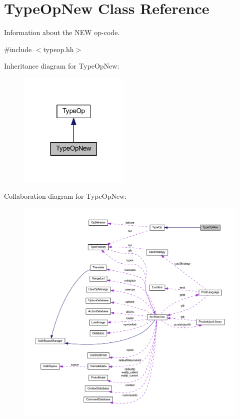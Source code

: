 \hypertarget{class_type_op_new}{}\section{Type\+Op\+New Class Reference}
\label{class_type_op_new}


Information about the N\+EW op-\/code.  




{\ttfamily \#include $<$typeop.\+hh$>$}



Inheritance diagram for Type\+Op\+New\+:
\nopagebreak
\begin{figure}[H]
\begin{center}
\leavevmode
\includegraphics[width=149pt]{class_type_op_new__inherit__graph}
\end{center}
\end{figure}


Collaboration diagram for Type\+Op\+New\+:
\nopagebreak
\begin{figure}[H]
\begin{center}
\leavevmode
\includegraphics[width=350pt]{class_type_op_new__coll__graph}
\end{center}
\end{figure}
